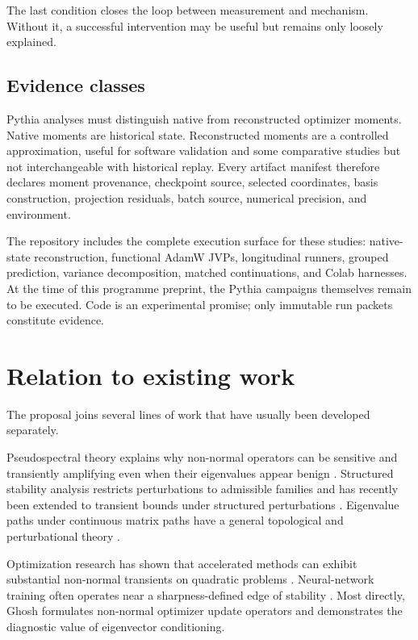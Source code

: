 The last condition closes the loop between measurement and mechanism.  Without it, a successful intervention may be useful but remains only loosely explained.

\subsection{Evidence classes}

Pythia analyses must distinguish native from reconstructed optimizer moments.  Native moments are historical state.  Reconstructed moments are a controlled approximation, useful for software validation and some comparative studies but not interchangeable with historical replay.  Every artifact manifest therefore declares moment provenance, checkpoint source, selected coordinates, basis construction, projection residuals, batch source, numerical precision, and environment.

The repository includes the complete execution surface for these studies: native-state reconstruction, functional AdamW JVPs, longitudinal runners, grouped prediction, variance decomposition, matched continuations, and Colab harnesses.  At the time of this programme preprint, the Pythia campaigns themselves remain to be executed.  Code is an experimental promise; only immutable run packets constitute evidence.

\section{Relation to existing work}

The proposal joins several lines of work that have usually been developed separately.

Pseudospectral theory explains why non-normal operators can be sensitive and transiently amplifying even when their eigenvalues appear benign \cite{trefethen2005}.  Structured stability analysis restricts perturbations to admissible families and has recently been extended to transient bounds under structured perturbations \cite{guglielmi2024}.  Eigenvalue paths under continuous matrix paths have a general topological and perturbational theory \cite{jankowski2019}.

Optimization research has shown that accelerated methods can exhibit substantial non-normal transients on quadratic problems \cite{mohammadi2021}.  Neural-network training often operates near a sharpness-defined edge of stability \cite{cohen2021}.  Most directly, Ghosh \cite{ghosh2026} formulates non-normal optimizer update operators and demonstrates the diagnostic value of eigenvector conditioning.

